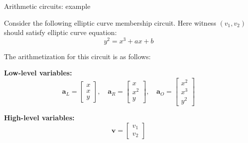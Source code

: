 \documentclass{zkdl-presentation-template}
\begin{document}
    \begin{frame}{Arithmetic circuits: example}
        \begin{example}
            Consider the following elliptic curve membership circuit. Here witness $(v_1, v_2)$ should satisfy elliptic curve equation:
            \begin{equation*}
                y^2 = x^3 + ax + b
            \end{equation*}

            The arithmetization for this circuit is as follows:
            \pause

            \textbf{Low-level variables:}
            \begin{equation*}
                \mathbf{a}_L = \begin{bmatrix} x \\ x \\ y \end{bmatrix}, \quad
                \mathbf{a}_R = \begin{bmatrix} x \\ x^2 \\ y \end{bmatrix}, \quad
                \mathbf{a}_O = \begin{bmatrix} x^2\\x^3 \\ y^2 \end{bmatrix}
            \end{equation*}
            \pause

            \textbf{High-level variables:}
            \begin{equation*}
                \mathbf{v} = \begin{bmatrix} v_1 \\ v_2 \end{bmatrix}
            \end{equation*}
        \end{example}
    \end{frame}
\end{document}

